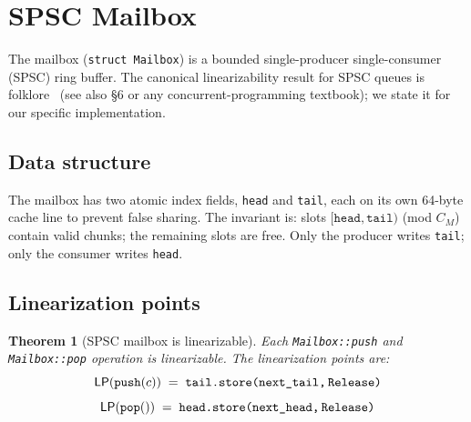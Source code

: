 \documentclass[11pt,a4paper]{article}
\newtheorem{theorem}{Theorem}[section]
\newcommand{\LP}[1]{\mathsf{LP}(#1)}
\newcommand{\code}[1]{\texttt{#1}}
\begin{document}
\section{SPSC Mailbox}
\label{sec:spsc}

The mailbox (\code{struct Mailbox}) is a bounded single-producer
single-consumer (SPSC) ring buffer.  The canonical linearizability
result for SPSC queues is folklore~\cite{treiber1986} (see also \cite{boehm2008}
\S{}6 or any concurrent-programming textbook); we state it for
our specific implementation.

\subsection{Data structure}

The mailbox has two atomic index fields, \code{head} and
\code{tail}, each on its own 64-byte cache line to prevent false
sharing.  The invariant is: slots $[\code{head}, \code{tail})$
(mod $C_M$) contain valid chunks; the remaining slots are free.
Only the producer writes \code{tail}; only the consumer writes
\code{head}.

\subsection{Linearization points}

\begin{theorem}[SPSC mailbox is linearizable]
\label{thm:spsc}
Each \code{Mailbox::push} and \code{Mailbox::pop} operation is
linearizable.  The linearization points are:
\[
  \LP{\code{push}(c)}    \;=\; \code{tail.store(next\_tail,\,Release)}
\]
\[
  \LP{\code{pop}()}      \;=\; \code{head.store(next\_head,\,Release)}
\]
\end{theorem}
\end{document}
